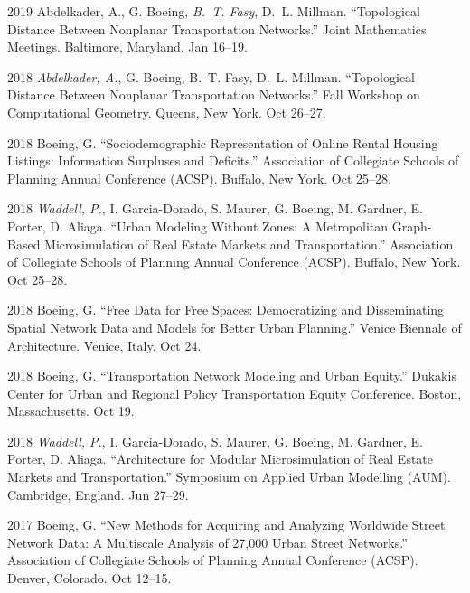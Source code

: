 \documentclass[12pt,letterpaper]{report}
\begin{document}
\begin{tablist}

\item[2019] \tab Abdelkader, A., G. Boeing, \textit{B.~T. Fasy}, D.~L. Millman. \enquote{Topological Distance Between Nonplanar Transportation Networks.} Joint Mathematics Meetings. Baltimore, Maryland. Jan 16--19.	

\item[2018] \tab \textit{Abdelkader, A.}, G. Boeing, B.~T. Fasy, D.~L. Millman. \enquote{Topological Distance Between Nonplanar Transportation Networks.} Fall Workshop on Computational Geometry. Queens, New York. Oct 26--27.

\item[2018] \tab Boeing, G. \enquote{Sociodemographic Representation of Online Rental Housing Listings: Information Surpluses and Deficits.} Association of Collegiate Schools of Planning Annual Conference (ACSP). Buffalo, New York. Oct 25--28.

\item[2018] \tab \textit{Waddell, P.}, I. Garcia-Dorado, S. Maurer, G. Boeing, M. Gardner, E. Porter, D. Aliaga. \enquote{Urban Modeling Without Zones: A Metropolitan Graph-Based Microsimulation of Real Estate Markets and Transportation.} Association of Collegiate Schools of Planning Annual Conference (ACSP). Buffalo, New York. Oct 25--28.

\item[2018] \tab Boeing, G. \enquote{Free Data for Free Spaces: Democratizing and Disseminating Spatial Network Data and Models for Better Urban Planning.} Venice Biennale of Architecture. Venice, Italy. Oct 24.

\item[2018] \tab Boeing, G. \enquote{Transportation Network Modeling and Urban Equity.} Dukakis Center for Urban and Regional Policy Transportation Equity Conference. Boston, Massachusetts. Oct 19.

\item[2018] \tab \textit{Waddell, P.}, I. Garcia-Dorado, S. Maurer, G. Boeing, M. Gardner, E. Porter, D. Aliaga. \enquote{Architecture for Modular Microsimulation of Real Estate Markets and Transportation.} Symposium on Applied Urban Modelling (AUM). Cambridge, England. Jun 27--29.

\item[2017] \tab Boeing, G. \enquote{New Methods for Acquiring and Analyzing Worldwide Street Network Data: A Multiscale Analysis of 27,000 Urban Street Networks.} Association of Collegiate Schools of Planning Annual Conference (ACSP). Denver, Colorado. Oct 12--15.


\end{tablist}
\end{document}
